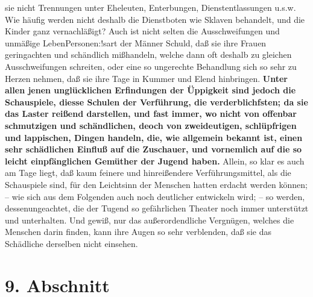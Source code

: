 sie nicht Trennungen unter Eheleuten, Enterbungen, Dienstentlassungen u.s.w.
Wie häufig werden nicht deshalb die Dienstboten wie Sklaven behandelt, und die
Kinder ganz vernachläßigt? Auch ist nicht selten die Ausschweifungen und
unmäßige LebenPersonen:!sart der Männer Schuld, daß sie ihre Frauen geringachten und
schändlich mißhandeln, welche dann oft deshalb zu gleichen Ausschweifungen
schreiten, oder eine so ungerechte Behandlung sich so sehr zu Herzen nehmen, daß
sie ihre Tage in Kummer und Elend hinbringen. \textbf{Unter allen jenen unglücklichen
Erfindungen der Üppigkeit sind jedoch die Schauspiele, diesse Schulen der
Verführung, die verderblichfsten; da sie das Laster reißend darstellen, und fast
immer, wo nicht von offenbar schmutzigen und schändlichen, deoch von
zweideutigen, schlüpfrigen und lappischen, Dingen handeln, die, wie allgemein
bekannt ist, einen sehr schädlichen Einfluß auf die Zuschauer, und vornemlich
auf die so leicht einpfänglichen Gemüther der Jugend haben.} Allein, so klar es
auch am Tage liegt, daß kaum feinere und hinreißendere Verführungsmittel, als
die Schauspiele sind, für den Leichtsinn der Menschen hatten erdacht werden
können; -- wie sich aus dem Folgenden auch noch deutlicher entwickeln wird; --
so werden, dessenungeachtet, die der Tugend so gefährlichen Theater noch immer
unterstützt und unterhalten. Und gewiß, nur das außerordendliche Vergnügen,
welches die Menschen darin finden, kann ihre Augen so sehr verblenden, daß sie
das Schädliche derselben nicht einsehen.

\section{9. Abschnitt} \label{kap15_ab9}

